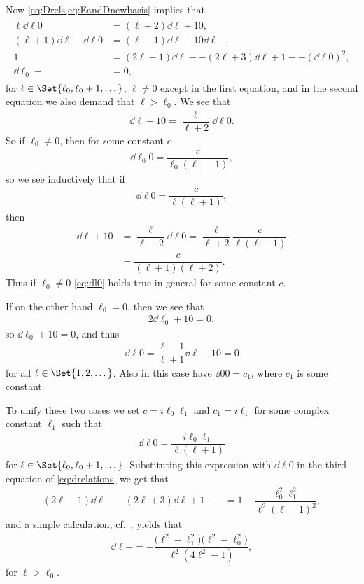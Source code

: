 Now \cref{eq:Drels,eq:EandDnewbasis} implies that
\begin{align}\label{eq:drelations}
  \begin{aligned}
    \ell \dd{\ell}{0} &= (\ell+2)\dd{\ell+1}{0}, \\
    (\ell+1)\dd{\ell}{-}\dd{\ell}{0} &= (\ell-1)\dd{\ell-1}{0}\dd{\ell}{-}, \\
    1 &= (2\ell-1)\dd{\ell}{-} - (2\ell+3)\dd{\ell+1}{-} - (\dd{\ell}{0})^2,\\
    \dd{\ell_0}{-} &= 0,
  \end{aligned}
\end{align}
for $\ell\in\Set{\ell_0,\ell_0+1,\dotsc}$, $\ell\neq 0$ except in the first equation, and in the second equation we also demand that $\ell>\ell_0$. We see that
\begin{align*}
  \dd{\ell+1}{0} = \dfrac{\ell}{\ell+2}\dd{\ell}{0}.
\end{align*}
So if $\ell_0\neq0$, then for some constant $c$ 
\begin{align*}
  \dd{\ell_0}{0} = \dfrac{c}{\ell_0(\ell_0+1)},
\end{align*}
so we see inductively that if
\begin{align}\label{eq:dl0}
  \dd{\ell}{0} = \dfrac{c}{\ell(\ell+1)},
\end{align}
then
\begin{align*}
  \dd{\ell+1}{0} &= \dfrac{\ell}{\ell+2}\dd{\ell}{0} = \dfrac{\ell}{\ell+2}\dfrac{c}{\ell(\ell+1)} \\
  &= \dfrac{c}{(\ell+1)(\ell+2)}.
\end{align*}
Thus if $\ell_0\neq 0$ \cref{eq:dl0} holds true in general for some constant $c$. 

If on the other hand $\ell_0=0$, then we see that
\begin{align*}
  2\dd{\ell_0+1}{0} = 0,
\end{align*}
so $\dd{\ell_0+1}{0}=0$, and thus
\begin{align*}
  \dd{\ell}{0} = \dfrac{\ell-1}{\ell+1}\dd{\ell-1}{0} = 0
\end{align*}
for all $\ell\in\Set{1,2,\dotsc}$. Also in this case have $\dd{0}{0}=c_1$, where $c_1$ is some constant. 

To unify these two cases we set $c=i\ell_0\ell_1$ and $c_1=i\ell_1$ for some complex constant $\ell_1$ such that
\begin{align}\label{eq:dl0res}
  \dd{\ell}{0} = \dfrac{i\ell_0\ell_1}{\ell(\ell+1)}
\end{align}
for $\ell\in\Set{\ell_0,\ell_0+1,\dotsc}$. Substituting this expression with $\dd{\ell}{0}$ in the third equation of \cref{eq:drelations} we get that
\begin{align*}
  (2\ell-1)\dd{\ell}{-} - (2\ell+3)\dd{\ell+1}{-} &= 1 - \dfrac{\ell_0^2\ell_1^2}{\ell^2(\ell+1)^2},
\end{align*}
and a simple calculation, cf.\ , yields that
\begin{align}\label{dl-res}
  \dd{\ell}{-} = -\dfrac{\bigl(\ell^2 - \ell_1^2\bigr)\bigl( \ell^2 - \ell_0^2 \bigr)}{\ell^2(4\ell^2-1)},
\end{align}
for $\ell>\ell_0$.

